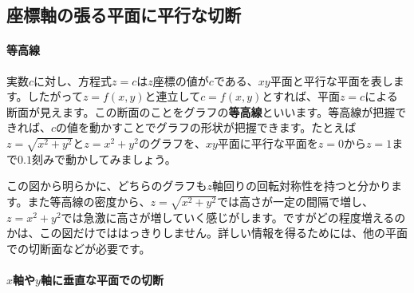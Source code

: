 \subsection{座標軸の張る平面に平行な切断}

\paragraph{等高線}

実数$c$に対し、方程式$z=c$は$z$座標の値が$c$である、$xy$平面と平行な平面を表します。したがって$z = f(x, y)$と連立して$c = f(x, y)$とすれば、平面$z=c$による断面が見えます。この断面のことをグラフの\textbf{等高線}といいます。等高線が把握できれば、$c$の値を動かすことでグラフの形状が把握できます。たとえば$z = \sqrt{x^2+y^2}$と$z = x^2 + y^2$のグラフを、$xy$平面に平行な平面を$z=0$から$z=1$まで$0.1$刻みで動かしてみましょう。

\begin{figure}[h!tbp]
\centering
{} \quad
{}
\end{figure}

この図から明らかに、どちらのグラフも$z$軸回りの回転対称性を持つと分かります。また等高線の密度から、$z = \sqrt{x^2 + y^2}$では高さが一定の間隔で増し、$z = x^2 + y^2$では急激に高さが増していく感じがします。ですがどの程度増えるのかは、この図だけでははっきりしません。詳しい情報を得るためには、他の平面での切断面などが必要です。

\paragraph{$x$軸や$y$軸に垂直な平面での切断}

